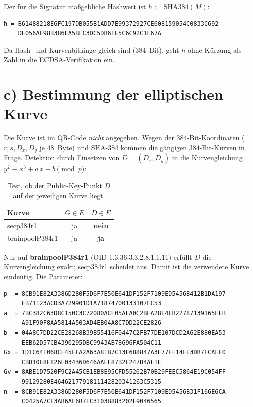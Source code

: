 \documentclass[
    fontsize=12pt,          %
    paper=a4,               %
    numbers=noenddot,       %
    listof=totoc,           %
    listof=entryprefix,     %
    listof=nochaptergap,    %
    bibliography=totoc,     %
    parskip=half,           %
    openany                 %
]{scrbook}
\begin{document}
Der für die Signatur maßgebliche Hashwert ist $h := \mathrm{SHA384}(M)$:

\begin{lstlisting}[caption={Hashwert $h=\mathrm{SHA384}(M)$}]
h = B61488218E6FC197DB055B1ADD7E99372927CE608159054C0833C692
    DE056AE98B386EA5BFC3DC5DB6FE5C6C92C1F67A
\end{lstlisting}

\noindent Da Hash- und Kurvenbitlänge gleich sind ($384$~Bit), geht $h$ ohne Kürzung als
Zahl in die ECDSA-Verifikation ein.


\section*{c) Bestimmung der elliptischen Kurve}

Die Kurve ist im QR-Code \emph{nicht} angegeben. Wegen der $384$-Bit-Koordinaten
($r,s,D_x,D_y$ je $48$~Byte) und SHA-384 kommen die gängigen $384$-Bit-Kurven in Frage.
Detektion durch Einsetzen von $D=(D_x,D_y)$ in die Kurvengleichung
$y^2 \equiv x^3 + a\,x + b \pmod p$:

\begin{table}[H]
    \centering
    \begin{tabular}{l c c}
        \toprule
        \textbf{Kurve} & $G \in E$ & $D \in E$ \\
        \midrule
        secp384r1        & ja  & \textbf{nein} \\
        brainpoolP384r1  & ja  & \textbf{ja} \\
        \bottomrule
    \end{tabular}
    \caption{Test, ob der Public-Key-Punkt $D$ auf der jeweiligen Kurve liegt.}
\end{table}

\noindent Nur auf \textbf{brainpoolP384r1} (OID 1.3.36.3.3.2.8.1.1.11) erfüllt $D$ die
Kurvengleichung exakt; secp384r1 scheidet aus. Damit ist die verwendete Kurve eindeutig.
Die Parameter:

\begin{lstlisting}[caption={Parameter der Kurve brainpoolP384r1}]
p  = 8CB91E82A3386D280F5D6F7E50E641DF152F7109ED5456B412B1DA197
     FB71123ACD3A729901D1A71874700133107EC53
a  = 7BC382C63D8C150C3C72080ACE05AFA0C2BEA28E4FB22787139165EFB
     A91F90F8AA5814A503AD4EB04A8C7DD22CE2826
b  = 04A8C7DD22CE28268B39B55416F0447C2FB77DE107DCD2A62E880EA53
     EEB62D57CB4390295DBC9943AB78696FA504C11
Gx = 1D1C64F068CF45FFA2A63A81B7C13F6B8847A3E77EF14FE3DB7FCAFE0
     CBD10E8E826E03436D646AAEF87B2E247D4AF1E
Gy = 8ABE1D7520F9C2A45CB1EB8E95CFD55262B70B29FEEC5864E19C054FF
     99129280E4646217791811142820341263C5315
n  = 8CB91E82A3386D280F5D6F7E50E641DF152F7109ED5456B31F166E6CA
     C0425A7CF3AB6AF6B7FC3103B883202E9046565
\end{lstlisting}
\end{document}
